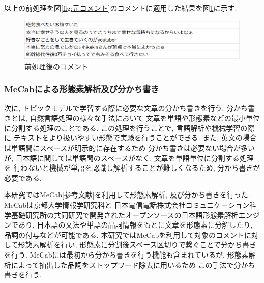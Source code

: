 \documentclass{ltjarticle}
\begin{document}
以上の前処理を図\ref{fig:元コメント}のコメントに適用した結果を図\ref{fig:前処理}に示す. 
\begin{figure}[h]
    \centering
    \includegraphics[width=14.5cm]{images/前処理適用.png}
    \caption{前処理後のコメント}
    \label{fig:前処理}
\end{figure}

\subsubsection{MeCabによる形態素解析及び分かち書き}
次に, トピックモデルで学習する際に必要な文章の分かち書きを行う. 分かち書きとは, 自然言語処理の様々な手法において
文章を単語や形態素などの最小単位に分割する処理のことである. この処理を行うことで, 言語解析や機械学習の際に
テキストをより扱いやすい形態で実験を行うことができる. また, 英文の場合は単語間にスペースが明示的に存在するため
分かち書きは必要ない場合が多いが, 日本語に関しては単語間のスペースがなく, 文章を単語単位に分割する処理を
行わないと機械が単語を認識し解析することが難しくなるため, 分かち書きが必要である. 

本研究ではMeCab[参考文献]を利用して形態素解析, 及び分かち書きを行った. MeCabは京都大学情報学研究科と
日本電信電話株式会社コミュニケーション科学基礎研究所の共同研究で開発されたオープンソースの日本語形態素解析エンジンであり, 
日本語の文法や単語の品詞情報をもとに文章を形態素に分解したり, 品詞の付与などが可能である. 
本研究ではMeCabを利用して対象のコメントに対して形態素解析を行い, 形態素に分割後スペース区切りで繋ぐことで分かち書きを行う. 
MeCabには最初から分かち書きを行う機能も含まれているが, 形態素解析によって抽出した品詞をストップワード除去に用いるため
この手法で分かち書きを行う. 
   
\end{document}

